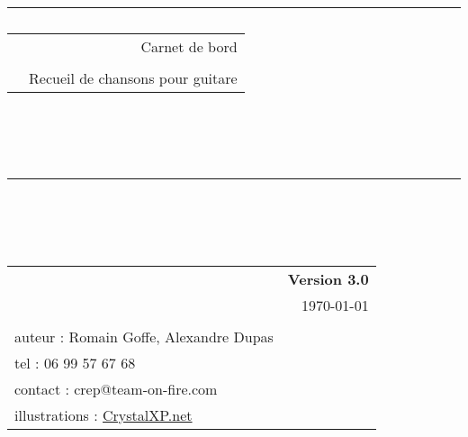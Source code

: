 \newlength{\larg}
\setlength{\larg}{14.5cm}

\title{
{\rule{\larg}{1mm}}\vspace{7mm}
\begin{tabular}{p{4cm} r}
   & {\Huge {Carnet de bord}} \\
   & \\
   & {\Large Recueil de chansons pour guitare}
\end{tabular}\\
\vspace{2mm}
{\rule{\larg}{1mm}}
\vspace{2mm} \\
\begin{tabular}{p{11cm} r}
   & {\large \bf Version 3.0} \\
   & {\large  \today} \\
   & \\
   \small auteur : Romain Goffe, Alexandre Dupas & \\
   \small tel : 06 99 57 67 68 & \\
   \small contact : crep@team-on-fire.com& \\
   \small illustrations : \href{http://tux.crystalxp.net/}{CrystalXP.net}
   & \\
   \hline
\end{tabular}\\
}
\author{}
\date{}

